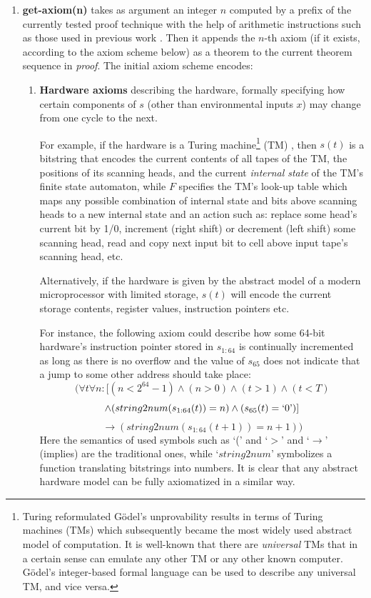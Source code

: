 \begin{enumerate}

\item {\bf get-axiom(n)}
takes as argument an integer $n$ computed 
by a prefix of the currently tested proof technique
with the help of arithmetic instructions 
such as those used in previous work
\cite{Schmidhuber:04oops}. 
Then it appends
the $n$-th axiom (if it exists, according to the axiom scheme below) 
as a theorem to the current theorem
sequence in {\em proof}.  The initial axiom scheme encodes:

\begin{enumerate}
\item
\label{hardwareaxioms}
{\bf Hardware axioms}
describing the hardware,
formally specifying how 
certain components of $s$ (other than
environmental inputs $x$) may
change from one cycle to the next. 

For example, if the hardware is a
Turing machine\footnote{
Turing reformulated G\"{o}del's unprovability results in terms
of Turing machines (TMs) \cite{Turing:36} which
subsequently became the most widely used abstract model of
computation.  It is well-known that there are {\em universal}
TMs that in a certain sense can emulate any other TM or any
other known computer.  G\"{o}del's integer-based formal language
can be used to describe any universal TM, and vice versa.}
(TM) \cite{Turing:36},
then $s(t)$ is a bitstring that encodes the current
contents of all tapes of the TM, the positions of its
scanning heads, and the current {\em internal state}
of the TM's finite state automaton, while $F$ specifies
the TM's look-up table which maps any possible combination
of internal state and bits above scanning heads
to a new internal state and an action such as:
replace some head's current bit by 1/0, increment
(right shift) or decrement (left shift) some
scanning head, read and copy next input bit to cell above
input tape's scanning head,
etc.  

Alternatively, if the hardware is given by the abstract model
of a modern microprocessor with limited storage, $s(t)$ will
encode the current storage contents,
register values,
instruction pointers etc.

For instance, the following axiom could
describe how some 64-bit hardware's instruction pointer
stored in $s_{1:64}$ is continually incremented as long as 
there is no overflow and the value
of $s_{65}$ does not indicate that a jump to some other address
should take place:
\[
(\forall t \forall n :
[(n < 2^{64}-1) \wedge  (n > 0) \wedge  (t > 1) \wedge  (t < T) 
\]
\[
\wedge 
(string2num(s_{1:64}(t))=n) 
\wedge (s_{65}(t)=`0\textrm{'}) ]
\]
\[
\rightarrow
(string2num(s_{1:64}(t+1))=n+1))
\]
Here the semantics of used symbols such 
as `('  and `$>$'  and `$\rightarrow$' (implies)
are the traditional ones, while `$string2num$'
symbolizes a function
translating bitstrings into numbers.
It is clear that any abstract hardware model can be
fully axiomatized in a similar way.



\end{enumerate}
\end{enumerate}

